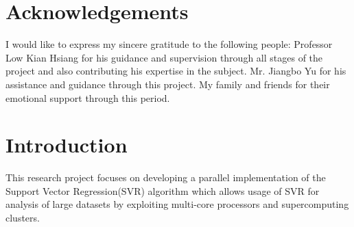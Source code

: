 \documentclass[12pt]{article}
\newcounter{reportpage}
\begin{document}
\section*{Acknowledgements}
%
I would like to express my sincere gratitude to the following people:
\newline
\newline
Professor Low Kian Hsiang for his guidance and supervision through all stages of the project and also contributing his expertise in the subject.
\newline
\newline
Mr. Jiangbo Yu for his assistance and guidance through this project.
\newline
\newline
My family and friends for their emotional support through this period.
\cleardoublepage
\setcounter{reportpage}{\value{page}}
\tableofcontents
\cleardoublepage
{}
\section{Introduction}
This research project focuses on developing a parallel implementation of the Support Vector Regression(SVR) algorithm which allows usage of SVR for analysis of large datasets by exploiting multi-core processors and supercomputing clusters. 
\end{document}
